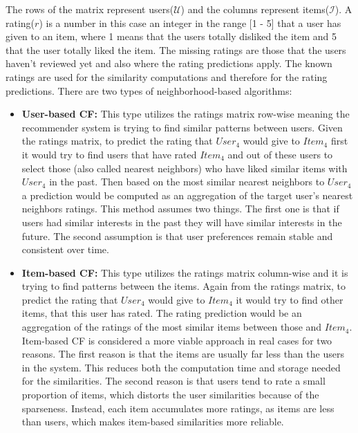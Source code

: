 \justify
The rows of the matrix represent users($\mathcal{U}$) and the
columns represent items($\mathcal{I}$). A rating($r$) is a number in this case an integer in
the range [1 - 5] that a user has given to an item, where 1 means that
the users totally disliked the item and 5 that the user totally liked the item. The missing ratings are those
that the users haven't reviewed yet and also where the rating predictions apply.
The known ratings are used for the similarity computations and therefore for
the rating predictions. There are two types of neighborhood-based algorithms:
\begin{itemize}
	\item \textbf{User-based CF:}  This type utilizes the ratings matrix
	row-wise meaning the recommender system is trying to find similar patterns
	between users. Given the ratings matrix, to predict the rating that
	$User_4$ would give to $Item_4$ first it would try to find users
	that have rated $Item_4$ and out of these users to select those
	(also called nearest neighbors) who have liked similar items with $User_4$
	in the past. Then based on the most similar nearest neighbors to $User_4$
	a prediction would be computed as an aggregation of the target user's nearest neighbors
	ratings. This method assumes two things. The first one is that if users
	had similar interests in the past they will have similar interests in the future.
	The second assumption is that user preferences remain stable and
	consistent over time. \citep{Jannach}

	\item \textbf{Item-based CF:} This type utilizes the ratings matrix
	column-wise and it is trying to find patterns between the items. Again
	from the ratings matrix, to predict the rating that $User_4$ would give to
	$Item_4$ it would try to find other items, that this user has rated. The
	rating prediction would  be an aggregation of the ratings of the most similar
	items between those and $Item_4$. Item-based CF is considered a more viable approach in
	real cases for two reasons. The first reason is that the items are usually far
	less than the users	in the system. This reduces both the computation
	time and storage needed for the similarities. The second reason is that
	users tend to rate a small proportion of items, which distorts the
	user similarities because of the sparseness. Instead, each item accumulates more
	ratings, as items are less than users, which makes item-based
	similarities more reliable.\citep{sarwar2001item}
\end{itemize}

